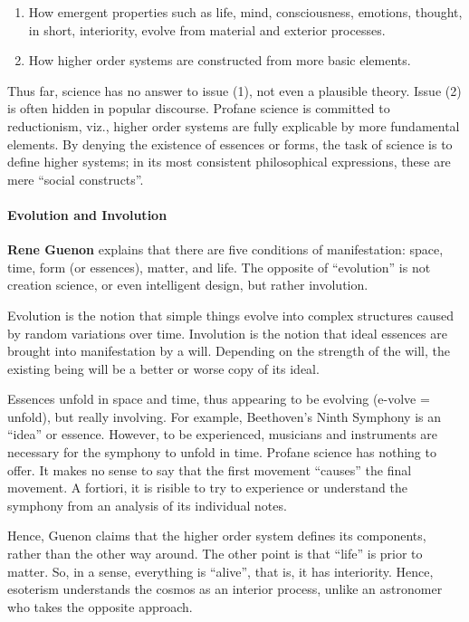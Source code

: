 \begin{enumerate}
\item How emergent properties such as life, mind, consciousness, emotions, thought, in short, interiority, evolve from material and exterior processes. 
\item How higher order systems are constructed from more basic elements. 
\end{enumerate}
Thus far, science has no answer to issue (1), not even a plausible theory. Issue (2) is often hidden in popular discourse. Profane science is committed to reductionism, viz., higher order systems are fully explicable by more fundamental elements. By denying the existence of essences or forms, the task of science is to define higher systems; in its most consistent philosophical expressions, these are mere “social constructs”.

\paragraph{Evolution and Involution}
\textbf{Rene Guenon} explains that there are five conditions of manifestation: space, time, form (or essences), matter, and life. The opposite of “evolution” is not creation science, or even intelligent design, but rather involution.

Evolution is the notion that simple things evolve into complex structures caused by random variations over time. Involution is the notion that ideal essences are brought into manifestation by a will. Depending on the strength of the will, the existing being will be a better or worse copy of its ideal.

Essences unfold in space and time, thus appearing to be evolving (e-volve = unfold), but really involving. For example, Beethoven's Ninth Symphony is an “idea” or essence. However, to be experienced, musicians and instruments are necessary for the symphony to unfold in time. Profane science has nothing to offer. It makes no sense to say that the first movement “causes” the final movement. A fortiori, it is risible to try to experience or understand the symphony from an analysis of its individual notes.

Hence, Guenon claims that the higher order system defines its components, rather than the other way around. The other point is that “life” is prior to matter. So, in a sense, everything is “alive”, that is, it has interiority. Hence, esoterism understands the cosmos as an interior process, unlike an astronomer who takes the opposite approach.

